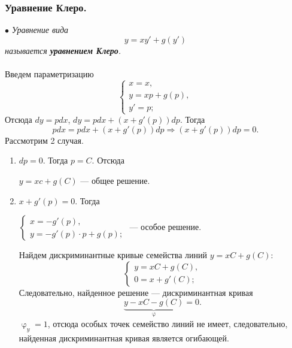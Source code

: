 \documentclass[a4paper, 12pt]{report}
\renewcommand{\varphi}{\upvarphi}
\begin{document}
\subsubsection{Уравнение Клеро.}
$\bullet$ \textit{Уравнение вида $$y = xy' + g(y')$$ называется \textbf{уравнением Клеро}.}\\\\
Введем параметризацию $$\begin{cases}
	x = x,\\
	y = xp + g(p),\\
	y' = p;
\end{cases}$$
Отсюда $dy = pdx$, $dy = pdx + (x + g'(p))dp.$ Тогда $$pdx = pdx + (x + g'(p))dp \Rightarrow (x + g'(p))dp = 0.$$
Рассмотрим 2 случая.\begin{enumerate}
	\item $dp = 0$. Тогда $p = C$. Отсюда \begin{center}
		$y = xc + g(C)$ --- общее решение.
	\end{center}
\item $x + g'(p) = 0.$ Тогда \begin{center}
	$\begin{cases}
		x = -g'(p),\\
		y = -g'(p)\cdot p + g(p);
	\end{cases}$ --- особое решение.
\end{center}
Найдем дискриминантные кривые семейства линий $y = xC + g(C)$:
$$\begin{cases}
	y = xC + g(C),\\
	0 = x + g'(C);
\end{cases}$$
Следовательно, найденное решение --- дискриминантная кривая $$\underbrace{y - xC - g(C)}_{\varphi} = 0.$$
$\varphi_y = 1$, отсюда особых точек семейство линий не имеет, следовательно, найденная дискриминантная кривая является огибающей.
\end{enumerate}
\end{document}
